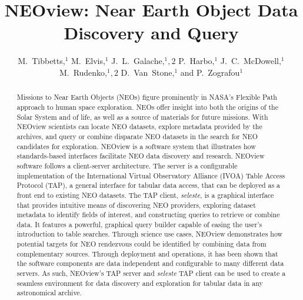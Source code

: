 
\resetcounters


\title{NEOview: Near Earth Object Data Discovery and Query}
\author{M.~Tibbetts,$^1$ M.~Elvis,$^1$ J.~L.~Galache,$^1,2$ P.~Harbo,$^1$ J.~C.~McDowell,$^1$ M.~Rudenko,$^1,2$ D.~Van~Stone,$^1$ and P.~Zografou$^1$
}


\begin{abstract}
Missions to Near Earth Objects (NEOs) figure prominently in NASA's Flexible Path approach to human space exploration. NEOs offer insight into both the origins of the Solar System and of life, as well as a source of materials for future missions. With NEOview scientists can locate NEO datasets, explore metadata provided by the archives, and query or combine disparate NEO datasets in the search for NEO candidates for exploration.  NEOview is a software system that illustrates how standards-based interfaces facilitate NEO data discovery and research.  NEOview software follows a client-server architecture. The server is a configurable implementation of the International Virtual Observatory Alliance (IVOA) Table Access Protocol (TAP), a general interface for tabular data access, that can be deployed as a front end to existing NEO datasets. The TAP client, \textit{seleste}, is a graphical interface that provides intuitive means of discovering NEO providers, exploring dataset metadata to identify fields of interest, and constructing queries to retrieve or combine data. It features a powerful, graphical query builder capable of easing the user's introduction to table searches.  Through science use cases, NEOview demonstrates how potential targets for NEO rendezvous could be identified by combining data from complementary sources. Through deployment and operations, it has been shown that the software components are data independent and configurable to many different data servers. As such, NEOview's TAP server and \textit{seleste} TAP client can be used to create a seamless environment for data discovery and exploration for tabular data in any astronomical archive.
\end{abstract}

